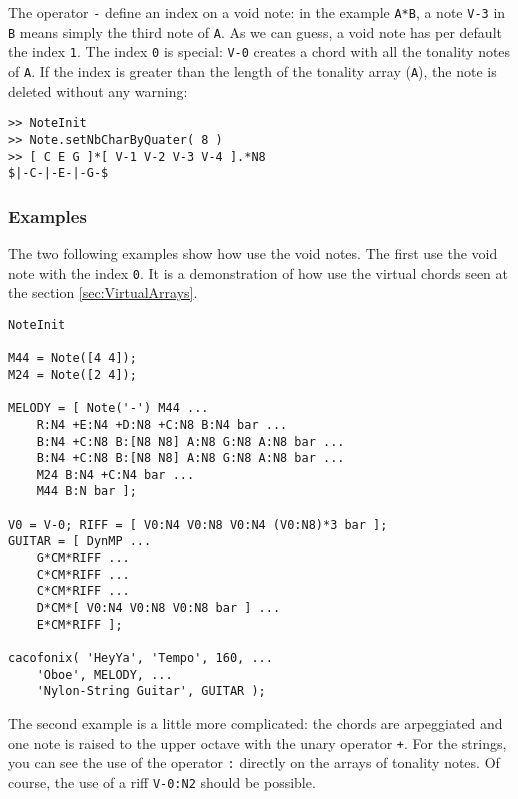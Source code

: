 \documentclass{article}
\begin{document}
The operator \lstinline!-! define an index on a void note: in the example \lstinline!A*B!, a note \lstinline!V-3! in \lstinline!B! means simply the third note of \lstinline!A!. As we can guess, a void note has per default the index \lstinline!1!. The index \lstinline!0! is special: \lstinline!V-0! creates a chord with all the tonality notes of \lstinline!A!. If the index is greater than the length of the tonality array (\lstinline!A!), the note is deleted without any warning:
\begin{lstlisting}
>> NoteInit
>> Note.setNbCharByQuater( 8 )
>> [ C E G ]*[ V-1 V-2 V-3 V-4 ].*N8
$|-C-|-E-|-G-$
\end{lstlisting}

\subsubsection{Examples}
\label{sec:voidExamples}

The two following examples show how use the void notes. The first use the void note with the index \lstinline!0!. It is a demonstration of how use the virtual chords seen at the section \ref{sec:VirtualArrays}.


\begin{lstlisting}
NoteInit

M44 = Note([4 4]);
M24 = Note([2 4]);

MELODY = [ Note('-') M44 ...
	R:N4 +E:N4 +D:N8 +C:N8 B:N4 bar ...
	B:N4 +C:N8 B:[N8 N8] A:N8 G:N8 A:N8 bar ...
	B:N4 +C:N8 B:[N8 N8] A:N8 G:N8 A:N8 bar ...
	M24 B:N4 +C:N4 bar ...
	M44 B:N bar ];

V0 = V-0; RIFF = [ V0:N4 V0:N8 V0:N4 (V0:N8)*3 bar ];
GUITAR = [ DynMP ...
	G*CM*RIFF ...
	C*CM*RIFF ...
	C*CM*RIFF ...
	D*CM*[ V0:N4 V0:N8 V0:N8 bar ] ...
	E*CM*RIFF ];

cacofonix( 'HeyYa', 'Tempo', 160, ...
	'Oboe', MELODY, ...
	'Nylon-String Guitar', GUITAR );
\end{lstlisting}

The second example is a little more complicated: the chords are arpeggiated and one note is raised to the upper octave with the unary operator \lstinline!+!. For the strings, you can see the use of the operator \lstinline!:! directly on the arrays of tonality notes. Of course, the use of a riff \lstinline!V-0:N2! should be possible.
\end{document}
